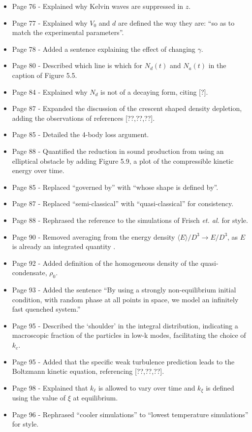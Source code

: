 \documentclass{article}
\begin{document}
\begin{itemize}
\item Page 76 - Explained why Kelvin waves are suppressed in $z$.
\item Page 77 - Explained why $V_0$ and $d$ are defined the way they are: ``so as to match the experimental parameters''.
\item Page 78 - Added a sentence explaining the effect of changing $\gamma$.
\item Page 80 - Described which line is which for $N_d(t)$ and $N_a(t)$ in the caption of Figure 5.5.
\item Page 84 - Explained why $N_d$ is not of a decaying form, citing [?].
\item Page 87 - Expanded the discussion of the crescent shaped density depletion, adding the observations of references [??,??,??].
\item Page 85 - Detailed the 4-body loss argument.
\item Page 88 - Quantified the reduction in sound production from using an elliptical obstacle by adding Figure 5.9, a plot of the compressible kinetic energy over time.
\item Page 85 - Replaced ``governed by'' with ``whose shape is defined by''.
\item Page 87 - Replaced ``semi-classical'' with ``quasi-classical'' for consistency.
\item Page 88 - Rephrased the reference to the simulations of Frisch {\it et. al.} for style.
\item Page 90 - Removed averaging from the energy density $\langle E \rangle/D^3 \rightarrow E/D^3$, as $E$ is already an integrated quantity .
\item Page 92 - Added definition of the homogeneous density of the quasi-condensate, $\rho_0$.
\item Page 93 - Added the sentence ``By using a strongly non-equilibrium initial condition, with random phase at all points in space, we model an infinitely fast quenched system.''
\item Page 95 - Described the `shoulder' in the integral distribution, indicating a macroscopic fraction of the particles in low-k modes, facilitating the choice of $k_c$.
\item Page 95 - Added that the specific weak turbulence prediction leads to the Boltzmann kinetic equation, referencing [??,??,??].
\item Page 98 - Explained that $k_\ell$ is allowed to vary over time and $k_\xi$ is defined using the value of $\xi$ at equilibrium.
\item Page 96 - Rephrased ``cooler simulations'' to ``lowest temperature simulations'' for style.

\end{itemize}
\end{document}
